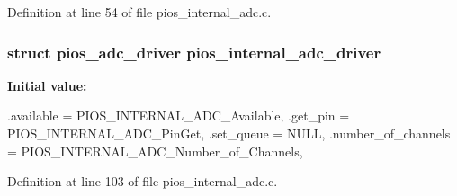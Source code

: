 \-Definition at line 54 of file pios\-\_\-internal\-\_\-adc.\-c.

\hypertarget{group___p_i_o_s___a_d_c_gaa1decc30319efc11cab3d3e9ba32ff8e}{
\subsubsection[{pios\-\_\-internal\-\_\-adc\-\_\-driver}]{\setlength{\rightskip}{0pt plus 5cm}struct {\bf pios\-\_\-adc\-\_\-driver} {\bf pios\-\_\-internal\-\_\-adc\-\_\-driver}}}\label{group___p_i_o_s___a_d_c_gaa1decc30319efc11cab3d3e9ba32ff8e}
{\bfseries \-Initial value\-:}
\begin{DoxyCode}
 {
                .available      = PIOS_INTERNAL_ADC_Available,
                .get_pin        = PIOS_INTERNAL_ADC_PinGet,
                .set_queue      = NULL,
                .number_of_channels = PIOS_INTERNAL_ADC_Number_of_Channels,
}
\end{DoxyCode}


\-Definition at line 103 of file pios\-\_\-internal\-\_\-adc.\-c.

